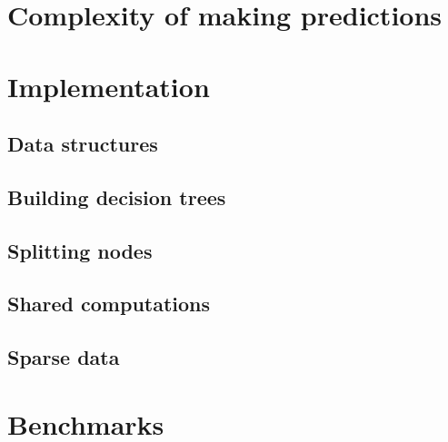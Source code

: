 \section{Complexity of making predictions}
\label{sec:5:complexity-predict}


\section{Implementation}
\label{sec:5:impl}


\subsection{Data structures}


\subsection{Building decision trees}


\subsection{Splitting nodes}


\subsection{Shared computations}


\subsection{Sparse data}


\section{Benchmarks}
\label{sec:5:benchmarks}


